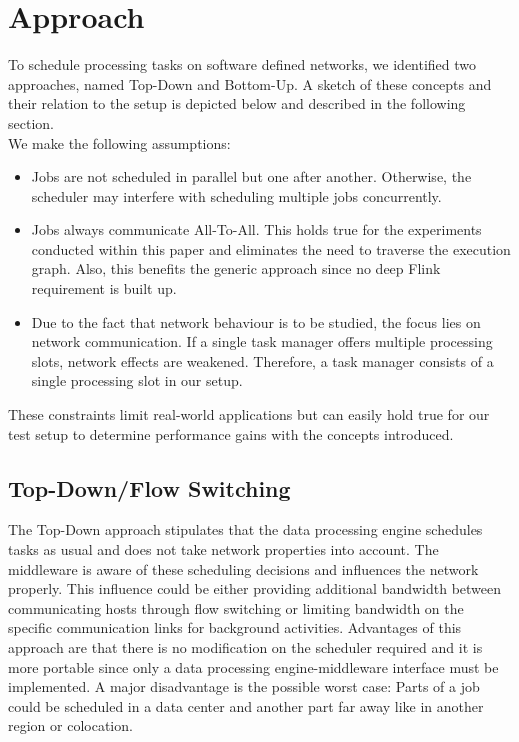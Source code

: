 \section{Approach}
To schedule processing tasks on software defined networks, we identified two approaches, named
Top-Down and Bottom-Up. A sketch of these concepts and their relation to the setup is depicted below
and described in the following section.\\

We make the following assumptions:
\begin{itemize}
\item Jobs are not scheduled in parallel but one after another. Otherwise, the scheduler may interfere
with scheduling multiple jobs concurrently.

\item Jobs always communicate All-To-All. This holds true for the experiments conducted within this paper
and eliminates the need to traverse the execution graph. Also, this benefits the generic approach
since no deep Flink requirement is built up.

\item Due to the fact that network behaviour is to be studied, the focus lies on network communication. If
a single task manager offers multiple processing slots, network effects are weakened. Therefore, a
task manager consists of a single processing slot in our setup.
\end{itemize}

These constraints limit real-world applications but can easily hold true for our test setup to
determine performance gains with the concepts introduced.

\subsection{Top-Down/Flow Switching}
The Top-Down approach stipulates that the data processing engine schedules tasks as usual and does
not take network properties into account. The middleware is aware of these scheduling decisions and
influences the network properly. This influence could be either providing additional bandwidth
between communicating hosts through flow switching or limiting bandwidth on the specific
communication links for background activities. Advantages of this approach are that there is no
modification on the scheduler required and it is more portable since only a data processing
engine-middleware interface must be implemented. A major disadvantage is the possible worst case:
Parts of a job could be scheduled in a data center and another part far away like in another region
or colocation.

